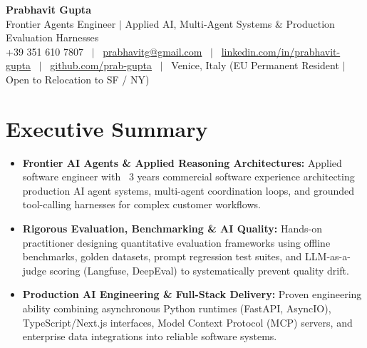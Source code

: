 \documentclass[a4paper,10pt]{article}
\begin{document}
\begin{minipage}[c]{0.80\textwidth}
  {\Huge\bfseries Prabhavit Gupta}\\[3pt]
  {\color{accent}\large Frontier Agents Engineer $\vert$ Applied AI, Multi-Agent Systems $\&$ Production Evaluation Harnesses}\\[6pt]
  {\footnotesize +39 351 610 7807 ~$\vert$~
  \href{mailto:prabhavitg@gmail.com}{prabhavitg@gmail.com} ~$\vert$~
  \href{https://www.linkedin.com/in/prabhavit-gupta}{linkedin.com/in/prabhavit-gupta} ~$\vert$~
  \href{https://github.com/prab-gupta}{github.com/prab-gupta} ~$\vert$~
  Venice, Italy (EU Permanent Resident $\vert$ Open to Relocation to SF / NY)}
\end{minipage}\hfill

\vspace{6pt}

\section{Executive Summary}
\begin{itemize}
  \item \textbf{Frontier AI Agents \& Applied Reasoning Architectures:} Applied software engineer with ~3 years commercial software experience architecting production AI agent systems, multi-agent coordination loops, and grounded tool-calling harnesses for complex customer workflows.
  \item \textbf{Rigorous Evaluation, Benchmarking \& AI Quality:} Hands-on practitioner designing quantitative evaluation frameworks using offline benchmarks, golden datasets, prompt regression test suites, and LLM-as-a-judge scoring (Langfuse, DeepEval) to systematically prevent quality drift.
  \item \textbf{Production AI Engineering \& Full-Stack Delivery:} Proven engineering ability combining asynchronous Python runtimes (FastAPI, AsyncIO), TypeScript/Next.js interfaces, Model Context Protocol (MCP) servers, and enterprise data integrations into reliable software systems.
\end{itemize}

\end{document}
